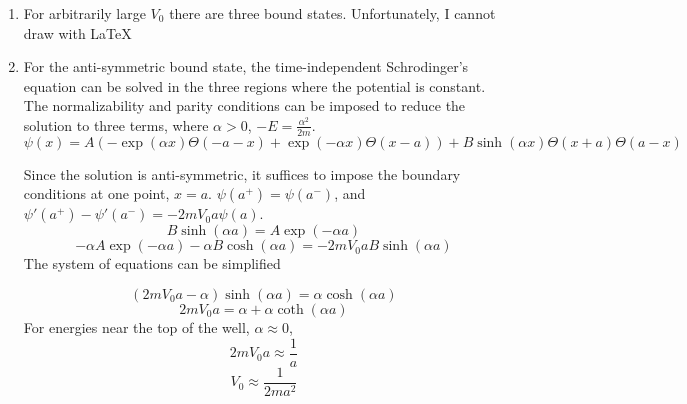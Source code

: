 \begin{sol}
\begin{enumerate}[label=\textbf{(\alph*)}]
    (iv) Yes, there can be a node at $x=0$\\
    A well behaved state can be constructed with a node at $x=0$. This state can be a function proportional to $\sinh(x)$ in the region $-a<x<a$, which satisfies all the necessary constraints of the system.
    \item 
	For arbitrarily large $V_0$ there are three bound states. Unfortunately, I cannot draw with \LaTeX    \item
    For the anti-symmetric bound state, the time-independent Schrodinger's equation can be solved in the three regions where the potential is constant. The normalizability and parity conditions can be imposed to reduce the solution to three terms, where $\alpha>0$, $-E=\frac{\alpha^2}{2m}$.
    $$\psi(x)=A(-\exp(\alpha x)\Theta(-a-x)+\exp(-\alpha x)\Theta(x-a))+B\sinh(\alpha x)\Theta(x+a)\Theta(a-x)$$
    
    Since the solution is anti-symmetric, it suffices to impose the boundary conditions at one point, $x=a$.
    $\psi(a^+)=\psi(a^-)$, and $\psi'(a^+)-\psi'(a^-)=-2mV_0a\psi(a)$.
    $$B\sinh(\alpha a)=A\exp(-\alpha a)$$
$$-\alpha A \exp(-\alpha a)-\alpha B\cosh(\alpha a)=-2mV_0aB\sinh(\alpha a)$$
    The system of equations can be  simplified
    
    $$(2mV_0a-\alpha)\sinh(\alpha a)=\alpha \cosh(\alpha a)$$
   $$2mV_0a=\alpha+\alpha\coth(\alpha a)$$
   For energies near the top of the well, $\alpha\approx 0$,
   $$2mV_0a\approx\frac{1}{a}$$
   $$V_0\approx\frac{1}{2ma^2}$$
   
	
\end{enumerate}
\end{sol}